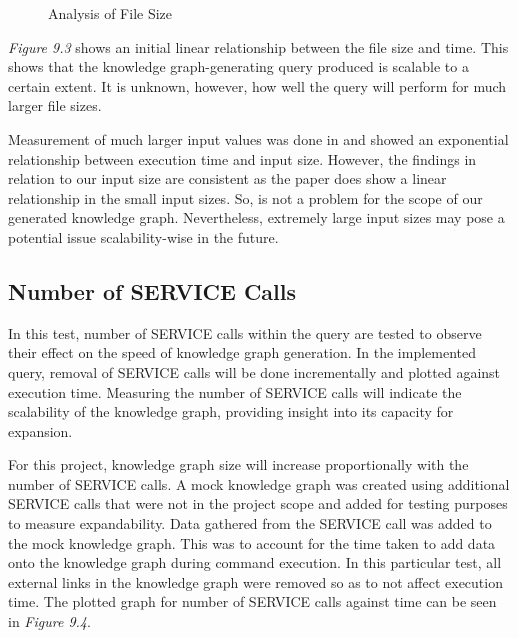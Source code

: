 \begin{figure}[H]
\begin{center}
\end{center}
\vspace{-0.75cm}
\caption{Analysis of File Size}
\end{figure}

\textit{Figure 9.3} shows an initial linear relationship between the file size and time. This shows that the knowledge graph-generating query produced is scalable to a certain extent. It is unknown, however, how well the query will perform for much larger file sizes. 

Measurement of much larger input values was done in \cite{sparqlanything} and showed an exponential relationship between execution time and input size. However, the findings in relation to our input size are consistent as the paper does show a linear relationship in the small input sizes. So, is not a problem for the scope of our generated knowledge graph. Nevertheless, extremely large input sizes may pose a potential issue scalability-wise in the future.

\subsection{Number of SERVICE Calls}
\hspace{0.5cm} In this test, number of SERVICE calls within the query are tested to observe their effect on the speed of knowledge graph generation. In the implemented query, removal of SERVICE calls will be done incrementally and plotted against execution time. Measuring the number of SERVICE calls will indicate the scalability of the knowledge graph, providing insight into its capacity for expansion.

For this project, knowledge graph size will increase proportionally with the number of SERVICE calls. A mock knowledge graph was created using additional SERVICE calls that were not in the project scope and added for testing purposes to measure expandability. Data gathered from the SERVICE call was added to the mock knowledge graph. This was to account for the time taken to add data onto the knowledge graph during command execution. In this particular test, all external links in the knowledge graph were removed so as to not affect execution time. The plotted graph for number of SERVICE calls against time can be seen in \textit{Figure 9.4}.

